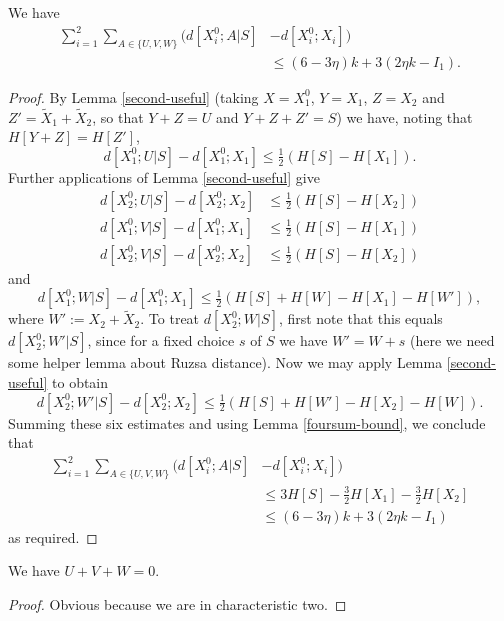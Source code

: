 \begin{lemma}\label{total-dist}
   We have
\begin{align*}
  \sum_{i=1}^2 \sum_{A\in\{U,V,W\}} \big(d[X^0_i;A|S] & - d[X^0_i;X_i]\big) \\
    &\leq (6 - 3\eta) k + 3(2 \eta k - I_1).
\end{align*}
\end{lemma}

\begin{proof}
  By Lemma \ref{second-useful} (taking $X = X_1^0$, $Y = X_1$, $Z = X_2$ and $Z' = \tilde X_1 + \tilde X_2$, so that $Y + Z = U$ and $Y + Z + Z' = S$) we have, noting that $H[Y+Z] = H[Z']$,
  \[
    d[X^0_1;U|S] - d[X^0_1;X_1] \leq \tfrac{1}{2} (H[S] -  H[X_1]).
  \]
  Further applications of Lemma \ref{second-useful} give
  \begin{align*}
  d[X^0_2;U|S] - d[X^0_2; X_2] &\leq \tfrac{1}{2} (H[S] -  H[X_2]) \\
  d[X^0_1;V|S] - d[X^0_1;X_1] &\leq \tfrac{1}{2} (H[S] -  H[X_1])\\
  d[X^0_2;V|S] - d[X^0_2;X_2] &\leq \tfrac{1}{2} (H[S] -  H[X_2])
  \end{align*}
  and
  \[ d[X^0_1;W|S] - d[X^0_1;X_1] \leq \tfrac{1}{2} (H[S] + H[W] - H[X_1] - H[W']),\] where $W' := X_2 + \tilde X_2$.
  To treat $d[X^0_2;W|S]$, first note that this equals $d[X^0_2;W'|S]$, since for a fixed choice $s$ of $S$ we have $W' = W + s$ (here we need some helper lemma about Ruzsa distance). Now we may apply Lemma \ref{second-useful} to obtain
  \[ d[X^0_2;W'|S] - d[X^0_2;X_2] \leq \tfrac{1}{2} (H[S] + H[W'] - H[X_2] - H[W]).\]
  Summing these six estimates and using Lemma \ref{foursum-bound}, we conclude that
  \begin{align*}
    \sum_{i=1}^2 \sum_{A\in\{U,V,W\}} \big(d[X^0_i;A|S] & - d[X^0_i;X_i]\big) \\
      &\leq 3H[S] - \tfrac{3}{2} H[X_1] - \tfrac{3}{2}H[X_2]\\
      &\leq (6 - 3\eta) k + 3(2 \eta k - I_1)
  \end{align*}
  as required.
\end{proof}

\begin{lemma}\label{key-ident}
We have $U+V+W=0$.
\end{lemma}

\begin{proof} Obvious because we are in characteristic two.
\end{proof}


